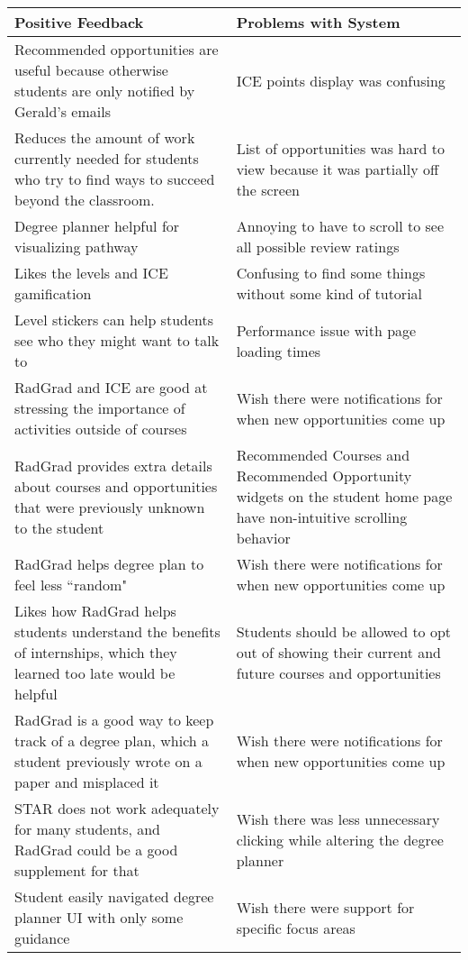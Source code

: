 \begin{table}[h!]
\centering
\begin{tabular}{ |p{8cm}|p{8cm}|}
 \hline
\textbf{Positive Feedback} & \textbf{Problems with System} \\
 \hline
 Recommended opportunities are useful because otherwise students are only notified by Gerald's emails  & ICE points display was confusing \\
 \hline
 Reduces the amount of work currently needed for students who try to find ways to succeed beyond the classroom. &List of opportunities was hard to view because it was partially off the screen\\
 \hline
 Degree planner helpful for visualizing pathway &Annoying to have to scroll to see all possible review ratings\\
  \hline
Likes the levels and ICE gamification &Confusing to find some things without some kind of tutorial \\
 \hline
Level stickers can help students see who they might want to talk to &Performance issue with page loading times \\
 \hline
RadGrad and ICE are good at stressing the importance of activities outside of courses &Wish there were notifications for when new opportunities come up\\
 \hline
RadGrad provides extra details about courses and opportunities that were previously unknown to the student &Recommended Courses and Recommended Opportunity widgets on the student home page have non-intuitive scrolling behavior\\
 \hline
RadGrad helps degree plan to feel less ``random" &Wish there were notifications for when new opportunities come up\\
 \hline
Likes how RadGrad helps students understand the benefits of internships, which they learned too late would be helpful &Students should be allowed to opt out of showing their current and future courses and opportunities\\
 \hline
RadGrad is a good way to keep track of a degree plan, which a student previously wrote on a paper and misplaced it & Wish there were notifications for when new opportunities come up \\
 \hline
 STAR does not work adequately for many students, and RadGrad could be a good supplement for that & Wish there was less unnecessary clicking while altering the degree planner\\
 \hline
Student easily navigated degree planner UI with only some guidance &Wish there were support for specific focus areas\\

\end{tabular}
\end{table}
